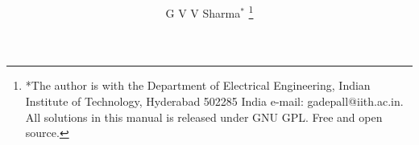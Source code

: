 \documentclass[journal,12pt,twocolumn]{IEEEtran}
\renewcommand\thesection{\arabic{section}}
\begin{document}
\let\StandardTheFigure\thefigure
\renewcommand{\thefigure}{\thesection}



\makeatletter
{}
\makeatother

\let\StandardTheFigure\thefigure
\let\StandardTheTable\thetable
\let\vec\mathbf





\def\putbox#1#2#3{\makebox[0in][l]{\makebox[#1][l]{}\raisebox{\baselineskip}[0in][0in]{\raisebox{#2}[0in][0in]{#3}}}}
     \def\rightbox#1{\makebox[0in][r]{#1}}
     \def\centbox#1{\makebox[0in]{#1}}
     \def\topbox#1{\raisebox{-\baselineskip}[0in][0in]{#1}}
     \def\midbox#1{\raisebox{-0.5\baselineskip}[0in][0in]{#1}}

\vspace{3cm}

\title{ 
}

\author{ G V V Sharma$^{*}$%
	\thanks{*The author is with the Department
		of Electrical Engineering, Indian Institute of Technology, Hyderabad
		502285 India e-mail:  gadepall@iith.ac.in. All solutions in this manual is released under GNU 
GPL.  Free and open source.}
	
}	

\maketitle

\tableofcontents

\bigskip

\renewcommand{\thefigure}{\theenumi}
\renewcommand{\thetable}{\theenumi}
\end{document}
